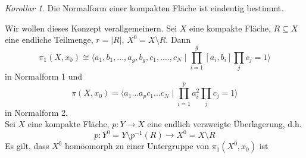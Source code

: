 \documentclass[a4paper, 12pt]{article}
\theoremstyle{plain}
\theoremstyle{definition}
\theoremstyle{lemma}
\theoremstyle{remark}
\theoremstyle{corollary}
\newtheorem{corollary}[theorem]{Korollar}
\theoremstyle{example}
\begin{document}
	\begin{corollary}
		Die Normalform einer kompakten Fläche ist eindeutig bestimmt.
	\end{corollary}
	Wir wollen dieses Konzept verallgemeinern. Sei $X$ eine kompakte Fläche, $R \subseteq X$ eine endliche Teilmenge, $r = \left|R\right|$, $X^0 = X \setminus R$. Dann \[\pi_1(X,x_0)  \cong \langle a_1,b_1,...,a_g,b_g, c_1,....,c_N \mid \prod_{i=1}^g [a_i,b_i]\prod_j c_j = 1\rangle\] in Normalform 1 und \[\pi(X,x_0) = \langle a_1...a_pc_1...c_N \mid \prod_{i=1}^p a_i^2 \prod_j c_j = 1\rangle\] in Normalform 2.\\
	Sei $X$ eine kompakte Fläche, $p:Y \to X$ eine endlich verzweigte Überlagerung, d.h. \[p: Y^0 = Y \setminus p^{-1}(R) \to X^0 = X \setminus R\] Es gilt, dass $X^0$ homöomorph zu einer Untergruppe von $\pi_1(X^0,x_0)$ ist 
\end{document}
